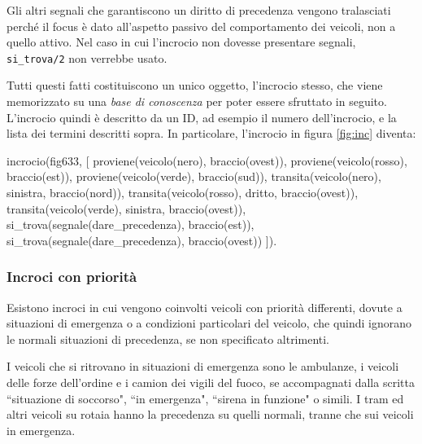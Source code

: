 Gli altri segnali che garantiscono un diritto di precedenza vengono tralasciati perché il focus è dato all'aspetto passivo del comportamento dei veicoli, non a quello attivo. Nel caso in cui l'incrocio non dovesse presentare segnali, \texttt{si\_trova/2} non verrebbe usato.



Tutti questi fatti costituiscono un unico oggetto, l'incrocio stesso, che viene memorizzato su una \emph{base di conoscenza} per poter essere sfruttato in seguito. L'incrocio quindi è descritto da un ID, ad esempio il numero dell'incrocio, e la lista dei termini descritti sopra. In particolare, l'incrocio in figura \ref{fig:inc} diventa:
\begin{verbatimtab}
incrocio(fig633, [
	proviene(veicolo(nero), braccio(ovest)),
	proviene(veicolo(rosso), braccio(est)),
	proviene(veicolo(verde), braccio(sud)),
	transita(veicolo(nero), sinistra, braccio(nord)),
	transita(veicolo(rosso), dritto, braccio(ovest)),
	transita(veicolo(verde), sinistra, braccio(ovest)),
	si_trova(segnale(dare_precedenza), braccio(est)),
	si_trova(segnale(dare_precedenza), braccio(ovest))
]).
\end{verbatimtab}

\subsubsection{Incroci con priorità}

Esistono incroci in cui vengono coinvolti veicoli con priorità differenti, dovute a situazioni di emergenza o a condizioni particolari del veicolo, che quindi ignorano le normali situazioni di precedenza, se non specificato altrimenti.

I veicoli che si ritrovano in situazioni di emergenza sono le ambulanze, i veicoli delle forze dell'ordine e i camion dei vigili del fuoco, se accompagnati dalla scritta ``situazione di soccorso", ``in emergenza", ``sirena in funzione" o simili. I tram ed altri veicoli su rotaia hanno la precedenza su quelli normali, tranne che sui veicoli in emergenza.


